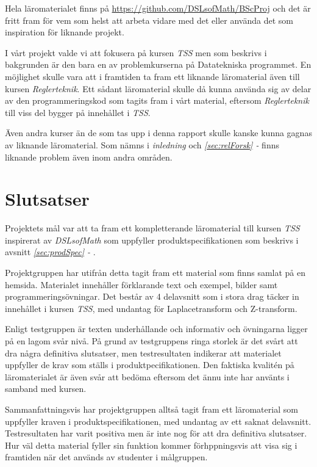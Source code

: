 \documentclass[12pt,a4paper,twoside,openright]{article}
\begin{document}
Hela läromaterialet finns på \url{https://github.com/DSLsofMath/BScProj} och det är
fritt fram för vem som helst att arbeta vidare med det eller använda
det som inspiration för liknande projekt.

I vårt projekt valde vi att fokusera på kursen \textit{TSS} men som
beskrivs i bakgrunden är den bara en av problemkurserna på
Datatekniska programmet. En möjlighet skulle vara att i framtiden ta
fram ett liknande läromaterial även till kursen
\textit{Reglerteknik}. Ett sådant läromaterial skulle då kunna använda
sig av delar av den programmeringskod som tagits fram i vårt material,
eftersom \textit{Reglerteknik} till viss del bygger på innehållet i
\textit{TSS}.

Även andra kurser än de som tas upp i denna rapport skulle kanske
kunna gagnas av liknande läromaterial. Som nämns i
\textit{inledning} och \textit{\ref{sec:relForsk} - }
finns liknande problem även inom andra områden.


\section{Slutsatser}

Projektets mål var att ta fram ett kompletterande läromaterial till
kursen \textit{TSS} inspirerat av \textit{DSLsofMath} som uppfyller
produktspecifikationen som beskrivs i avsnitt \textit{\ref{sec:prodSpec} - }.

Projektgruppen har utifrån detta tagit fram ett material som finns
samlat på en hemsida. Materialet innehåller förklarande text och exempel, bilder
samt programmeringsövningar. Det består av 4 delavsnitt
som i stora drag täcker in innehållet i kursen \textit{TSS}, med
undantag för Laplacetransform och Z-transform.

Enligt testgruppen är texten underhållande och informativ och
övningarna ligger på en lagom svår nivå. På grund av testgruppens
ringa storlek är det svårt att dra några definitiva slutsatser,
men testresultaten indikerar att materialet uppfyller de krav
som ställs i produktpecifikationen. Den faktiska kvalitén på
läromaterialet är även svår att bedöma eftersom det
ännu inte har använts i samband med kursen.

Sammanfattningsvis har projektgruppen alltså tagit
fram ett läromaterial som uppfyller kraven i produktspecifikationen,
med undantag av ett saknat delavsnitt. Testresultaten har varit
positiva men är inte nog för att dra definitiva slutsatser. Hur väl detta
material fyller sin funktion kommer förhppningsvis att
visa sig i framtiden när det används av studenter i målgruppen.
\end{document}

